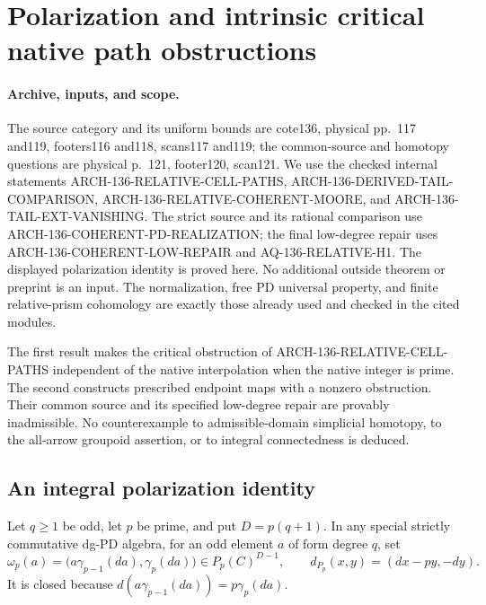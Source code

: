 \section{Polarization and intrinsic critical native path obstructions}
\label{sec:136-prime-native-interpolation}

\paragraph{Archive, inputs, and scope.}
The source category and its uniform bounds are cote136, physical
pp.~117 and119, footers116 and118, scans117 and119; the
common-source and homotopy questions are physical p.~121,
footer120, scan121.  We use the checked internal statements
ARCH-136-RELATIVE-CELL-PATHS,
ARCH-136-DERIVED-TAIL-COMPARISON,
ARCH-136-RELATIVE-COHERENT-MOORE, and
ARCH-136-TAIL-EXT-VANISHING.  The strict source and its rational
comparison use ARCH-136-COHERENT-PD-REALIZATION; the final low-degree
repair uses ARCH-136-COHERENT-LOW-REPAIR and AQ-136-RELATIVE-H1.
The displayed polarization identity
is proved here.  No additional outside theorem or preprint is an
input.  The normalization, free PD universal property, and finite
relative-prism cohomology are exactly those already used and checked
in the cited modules.

The first result makes the critical obstruction of
ARCH-136-RELATIVE-CELL-PATHS independent of the native interpolation
when the native integer is prime.  The second constructs prescribed
endpoint maps with a nonzero obstruction.  Their common source and
its specified low-degree repair are provably inadmissible.  No counterexample to admissible-domain
simplicial homotopy, to the all-arrow groupoid assertion, or to
integral connectedness is deduced.

\subsection{An integral polarization identity}

Let \(q\geq1\) be odd, let \(p\) be prime, and put
\(D=p(q+1)\).  In any special strictly commutative dg-PD algebra,
for an odd element \(a\) of form degree \(q\), set
\[
 \omega_p(a)=\bigl(a\gamma_{p-1}(da),\gamma_p(da)\bigr)
                           \in P_p(C)^{D-1},
 \qquad d_{P_p}(x,y)=(dx-py,-dy).
                                                               \tag{136.PI1}
\]
It is closed because
\(d(a\gamma_{p-1}(da))=p\gamma_p(da)\).

